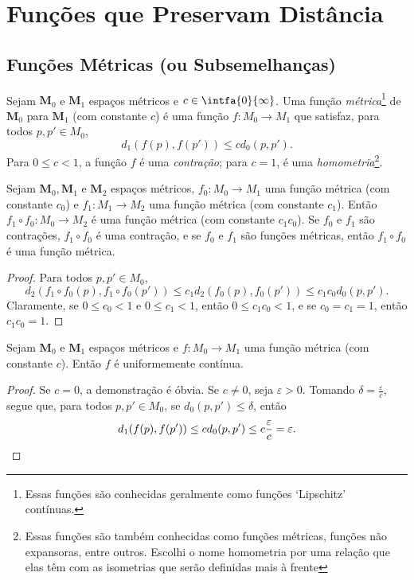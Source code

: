 \section{Funções que Preservam Distância}

\subsection{Funções Métricas (ou Subsemelhanças)}

\begin{defi}
Sejam $\bm M_0$ e $\bm M_1$ espaços métricos e $c \in \intfa{0}{\infty}$. Uma função \emph{métrica}\footnote{Essas funções são conhecidas geralmente como funções `Lipschitz' contínuas.} de $\bm M_0$ para $\bm M_1$ (com constante $c$) é uma função $f\colon M_0 \to M_1$ que satisfaz, para todos $p,p' \in M_0$,
	\begin{equation*}
	d_1(f(p),f(p')) \leq cd_0(p,p').
	\end{equation*}
Para $0 \leq c < 1$, a função $f$ é uma \emph{contração}; para $c=1$, é uma \emph{homometria}\footnote{Essas funções são também conhecidas como funções métricas, funções não expansoras, entre outros. Escolhi o nome homometria por uma relação que elas têm com as isometrias que serão definidas mais à frente}.
\end{defi}

\begin{prop}
Sejam $\bm M_0, \bm M_1$ e $\bm M_2$ espaços métricos, $f_0\colon M_0 \to M_1$ uma função métrica (com constante $c_0$) e $f_1\colon M_1 \to M_2$ uma função métrica (com constante $c_1$). Então $f_1 \circ f_0\colon M_0 \to M_2$ é uma função métrica (com constante $c_1c_0$). Se $f_0$ e $f_1$ são contrações, $f_1 \circ f_0$ é uma contração, e se $f_0$ e $f_1$ são funções métricas, então $f_1 \circ f_0$ é uma função métrica.
\end{prop}
\begin{proof}
Para todos $p,p' \in M_0$,
	\begin{equation*}
	d_2(f_1 \circ f_0(p),f_1 \circ f_0(p')) \leq c_1d_2(f_0(p),f_0(p')) \leq c_1c_0d_0(p,p').
	\end{equation*}
Claramente, se $0 \leq c_0 < 1$ e $0 \leq c_1 < 1$, então $0 \leq c_1c_0 < 1$, e se $c_0=c_1=1$, então $c_1c_0=1$.
\end{proof}

\begin{prop}
Sejam $\bm M_0$ e $\bm M_1$ espaços métricos e $f\colon M_0 \to M_1$ uma função métrica (com constante $c$). Então $f$ é uniformemente contínua.
\end{prop}
\begin{proof}
Se $c=0$, a demonstração é óbvia. Se $c \neq 0$, seja $\varepsilon>0$. Tomando $\delta=\frac{\varepsilon}{c}$, segue que, para todos $p,p' \in M_0$, se $d_0(p,p') \leq \delta$, então
	\begin{equation*}
	d_1(f(p),f(p')) \leq cd_0(p,p') \leq c\frac{\varepsilon}{c}=\varepsilon. \qedhere
	\end{equation*}
\end{proof}

